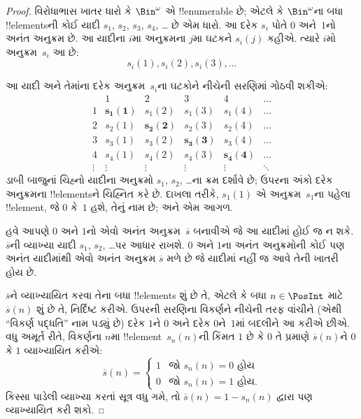 \documentclass[../../../include/open-logic-section]{subfiles}
\begin{document}
\begin{proof}
વિરોધાભાસ ખાતર ધારો કે $\Bin^\omega$ એ !!{enumerable} છે;
એટલે કે $\Bin^\omega$ના બધા !!{element}sની કોઈ યાદી
$s_{1}$, $s_{2}$, $s_{3}$, $s_{4}$, \dots{} છે એમ ધારો.
આ દરેક $s_i$ પોતે $0$ અને~$1$નો અનંત અનુક્રમ છે.
આ યાદીના $i$મા અનુક્રમના $j$મા ઘટકને $s_i(j)$ કહીએ.
ત્યારે $i$મો અનુક્રમ~$s_i$ આ છે:
\[
s_i(1), s_i(2), s_i(3), \dots
\]

આ યાદી અને તેમાંના દરેક અનુક્રમ~$s_i$ના ઘટકોને નીચેની
સરણિમાં ગોઠવી શકીએ:
\[
\begin{array}{c|c|c|c|c|c}
& 1 & 2 & 3 & 4 & \dots \\\hline
1 & \mathbf{s_{1}(1)} & s_{1}(2) & s_{1}(3) & s_1(4) & \dots \\\hline
2 & s_{2}(1)& \mathbf{s_{2}(2)} & s_2(3) & s_2(4) & \dots \\\hline
3 & s_{3}(1)& s_{3}(2) & \mathbf{s_3(3)} & s_3(4) & \dots \\\hline
4 & s_{4}(1)& s_{4}(2) & s_4(3) & \mathbf{s_4(4)} & \dots \\\hline
\vdots & \vdots & \vdots & \vdots & \vdots & \mathbf{\ddots}
\end{array}
\]
ડાબી બાજુનાં ચિહ્નો યાદીના અનુક્રમો $s_1$, $s_2$, \dots{}ના
ક્રમ દર્શાવે છે; ઉપરના અંકો દરેક અનુક્રમના !!{element}sને
ચિહ્નિત કરે છે. દાખલા તરીકે, $s_{1}(1)$ એ અનુક્રમ~$s_{1}$ના
પહેલા !!{element}, જે $0$ કે~$1$ હશે, તેનું નામ છે; અને એમ આગળ.

હવે આપણે $0$ અને $1$નો એવો અનંત અનુક્રમ~$\overline{s}$ બનાવીએ
જે આ યાદીમાં હોઈ જ ન શકે. $\overline{s}$ની વ્યાખ્યા યાદી
$s_1$, $s_2$, \dots પર આધાર રાખશે. $0$ અને $1$ના અનંત
અનુક્રમોની કોઈ પણ અનંત યાદીમાંથી એવો અનંત અનુક્રમ
$\overline{s}$ મળે છે જે યાદીમાં નહીં જ આવે તેની ખાતરી હોય છે.

$\overline{s}$ને વ્યાખ્યાયિત કરવા તેના બધા !!{element}s શું છે તે,
એટલે કે બધા $n \in \PosInt$ માટે $\overline{s}(n)$ શું છે તે,
નિર્દિષ્ટ કરીએ. ઉપરની સરણિના વિકર્ણને નીચેની તરફ વાંચીને
(એથી ``વિકર્ણ પદ્ધતિ'' નામ પડ્યું છે) દરેક $1$ને $0$ અને દરેક
$0$ને~$1$માં બદલીને આ કરીએ છીએ. વધુ અમૂર્ત રીતે,
વિકર્ણના $n$મા !!{element}~$s_n(n)$ની કિંમત $1$ છે કે $0$
તે પ્રમાણે $\overline{s}(n)$ને $0$ કે $1$ વ્યાખ્યાયિત કરીએ:
\[
\overline{s}(n) =
\begin{cases}
1 & \text{જો $s_{n}(n) = 0$ હોય}\\
0 & \text{જો $s_{n}(n) = 1$ હોય}.
\end{cases}
\]
કિસ્સા પાડેલી વ્યાખ્યા કરતાં સૂત્ર વધુ ગમે, તો
$\overline{s}(n) = 1 - s_n(n)$ દ્વારા પણ વ્યાખ્યાયિત કરી શકો.


\end{proof}
\end{document}

